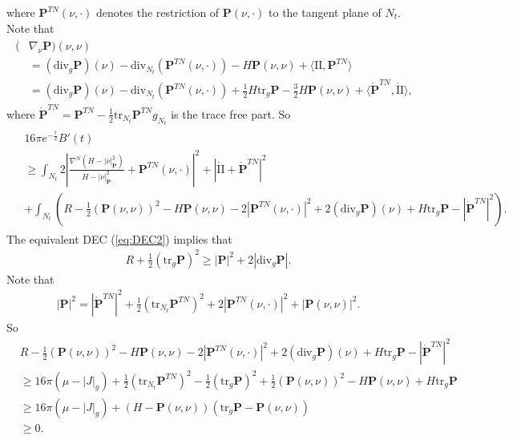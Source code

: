\documentclass[11pt,letterpaper]{amsart}
\theoremstyle{definition}
\theoremstyle{remark}
\newcommand{\Pten}{\mathbf P}
\begin{document}
	where $\Pten ^{TN}(\nu , \cdot )$ denotes the restriction of $\Pten(\nu ,\cdot )$ to the tangent plane of $N_t$. 
Note that
\begin{align}\label{nabla-P-id}
	\begin{split}
		(&\nabla _{\nu } \Pten) (\nu ,\nu ) \\
		&= (\mathrm{div}_{g} \Pten) (\nu ) - \mathrm{div}_{N_t}(\Pten ^{TN}(\nu ,\cdot ) ) -H \mathbf{P}(\nu ,\nu ) + \langle \mathrm{II}, \mathbf{P}^{TN} \rangle \\
&= (\mathrm{div}_{g} \Pten) (\nu ) - \mathrm{div}_{N_t}(\Pten ^{TN}(\nu ,\cdot ) )
						   + \frac{1}{2} H\mathrm{tr}_g \Pten - \frac{3}{2}H \Pten(\nu ,\nu )   + \langle \mathring{\Pten} ^{TN}, \mathring{\mathrm{II}} \rangle,
	\end{split}
\end{align} 
where $\mathring{\Pten} ^{TN} = \Pten ^{TN} - \frac{1}{2} \mathrm{tr}_{N_t} \Pten ^{TN} g_{N_t}	$ is the trace free part.
So
\begin{align*}
\begin{split}
	&16 \pi  e ^{-\frac{t}{2}}B'(t) \\
	&\geq  \int_{N_t} 2\left| \frac{\nabla ^{N} (H-|\nu |^2_{\Pten })}{H-|\nu |^2_{\Pten }} + \Pten ^{TN}(\nu , \cdot ) \right| ^2 + |\mathring{\mathrm{II}}+ \mathring{\Pten} ^{TN}|^2\\
	& + \int_{N_t} \left( R - \frac{1}{2} (\Pten(\nu ,\nu  ) )^2 - H \Pten(\nu ,\nu ) - 2 |\Pten ^{TN}(\nu ,\cdot )|^2 + 2 (\mathrm{div}_{g}\Pten)(\nu ) + H \mathrm{tr}_g \Pten - |\mathring{\Pten} ^{TN}|^2 \right) .
\end{split}	
\end{align*} 
The equivalent DEC (\ref{eq:DEC2}) implies that
\begin{align*}
	R + \frac{1}{2}(\mathrm{tr}_g \Pten)^2  \geq  |\Pten|^2 + 2 |\mathrm{div}_{g} \Pten|.
\end{align*} 
Note that
\begin{align*}
	|\Pten|^2 = |\mathring{\Pten} ^{TN}|^2+ \frac{1}{2} (\mathrm{tr}_{N_t} \Pten ^{TN})^2 + 2|\Pten ^{TN}(\nu ,\cdot )|^2 + |\Pten(\nu ,\nu )|^2.
\end{align*} 
So
\begin{align*}
	&R - \frac{1}{2} (\Pten(\nu ,\nu  ) )^2 - H \Pten(\nu ,\nu ) - 2 |\Pten ^{TN}(\nu ,\cdot )|^2 + 2 (\mathrm{div}_{g}\Pten)(\nu ) + H \mathrm{tr}_g \Pten - |\mathring{\Pten} ^{TN}|^2 \\
	& \geq 16 \pi (\mu -|J|_g)
	+ \frac{1}{2} (\mathrm{tr}_{N_t} \Pten ^{TN})^2  - \frac{1}{2} (\mathrm{tr}_{g}\Pten)^2 + \frac{1}{2} (\Pten(\nu ,\nu  ) )^2 - H \Pten(\nu ,\nu ) + H \mathrm{tr}_g \Pten \\
	&\geq 16 \pi (\mu -|J|_g)+ \left( H- \Pten(\nu ,\nu ) \right) \left( \mathrm{tr}_g \Pten -  \Pten(\nu ,\nu ) \right)  \\
	&\geq 0.
\end{align*} 
\end{document}
